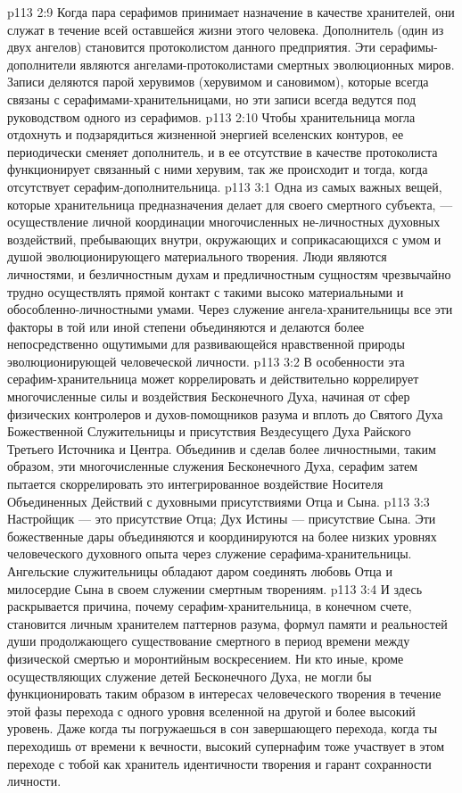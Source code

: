 \vs p113 2:9 Когда пара серафимов принимает назначение в качестве хранителей, они служат в течение всей оставшейся жизни этого человека. Дополнитель (один из двух ангелов) становится протоколистом данного предприятия. Эти серафимы\hyp{}дополнители являются ангелами\hyp{}протоколистами смертных эволюционных миров. Записи деляются парой херувимов (херувимом и сановимом), которые всегда связаны с серафимами\hyp{}хранительницами, но эти записи всегда ведутся под руководством одного из серафимов.
\vs p113 2:10 Чтобы хранительница могла отдохнуть и подзарядиться жизненной энергией вселенских контуров, ее периодически сменяет дополнитель, и в ее отсутствие в качестве протоколиста функционирует связанный с ними херувим, так же происходит и тогда, когда отсутствует серафим\hyp{}дополнительница.
\vs p113 3:1 Одна из самых важных вещей, которые хранительница предназначения делает для своего смертного субъекта, --- осуществление личной координации многочисленных не\hyp{}личностных духовных воздействий, пребывающих внутри, окружающих и соприкасающихся с умом и душой эволюционирующего материального творения. Люди являются личностями, и безличностным духам и предличностным сущностям чрезвычайно трудно осуществлять прямой контакт с такими высоко материальными и обособленно\hyp{}личностными умами. Через служение ангела\hyp{}хранительницы все эти факторы в той или иной степени объединяются и делаются более непосредственно ощутимыми для развивающейся нравственной природы эволюционирующей человеческой личности.
\vs p113 3:2 В особенности эта серафим\hyp{}хранительница может коррелировать и действительно коррелирует многочисленные силы и воздействия Бесконечного Духа, начиная от сфер физических контролеров и духов\hyp{}помощников разума и вплоть до Святого Духа Божественной Служительницы и присутствия Вездесущего Духа Райского Третьего Источника и Центра. Объединив и сделав более личностными, таким образом, эти многочисленные служения Бесконечного Духа, серафим затем пытается скоррелировать это интегрированное воздействие Носителя Объединенных Действий с духовными присутствиями Отца и Сына.
\vs p113 3:3 Настройщик --- это присутствие Отца; Дух Истины --- присутствие Сына. Эти божественные дары объединяются и координируются на более низких уровнях человеческого духовного опыта через служение серафима\hyp{}хранительницы. Ангельские служительницы обладают даром соединять любовь Отца и милосердие Сына в своем служении смертным творениям.
\vs p113 3:4 И здесь раскрывается причина, почему серафим\hyp{}хранительница, в конечном счете, становится личным хранителем паттернов разума, формул памяти и реальностей души продолжающего существование смертного в период времени между физической смертью и моронтийным воскресением. Ни кто иные, кроме осуществляющих служение детей Бесконечного Духа, не могли бы функционировать таким образом в интересах человеческого творения в течение этой фазы перехода с одного уровня вселенной на другой и более высокий уровень. Даже когда ты погружаешься в сон завершающего перехода, когда ты переходишь от времени к вечности, высокий супернафим тоже участвует в этом переходе с тобой как хранитель идентичности творения и гарант сохранности личности.
